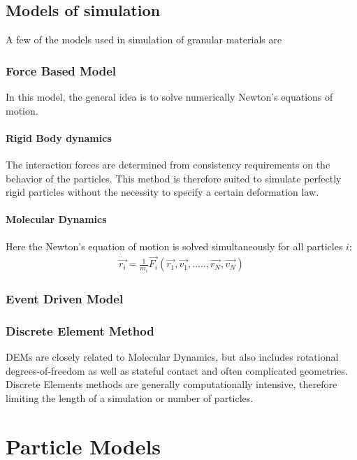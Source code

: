 \subsection{Models of simulation}

A few of the models used in simulation of granular materials are

\subsubsection{Force Based Model}

In this model, the general idea is to solve numerically Newton's equations of motion.

\paragraph{Rigid Body dynamics}
The interaction forces are determined from consistency requirements on the behavior of the particles. This method is therefore suited to simulate perfectly rigid particles without the necessity to specify a certain deformation law.

\paragraph{Molecular Dynamics}

Here the Newton's equation of motion is solved simultaneously for all particles $i$:
\begin{align*}
\ddot{\vec{r_{i}}} = \frac{1}{m_{i}} \vec{F_{i}}(\vec{r_{1}}, \vec{v_{1}},.....,\vec{r_{N}},\vec{v_{N}})
\end{align*}

\subsubsection{Event Driven Model}



\subsubsection{Discrete Element Method}

DEMs are closely related to Molecular Dynamics, but also includes rotational degrees-of-freedom as well as stateful contact and often complicated geometries. Discrete Elements methods are generally computationally intensive, therefore limiting the length of a simulation or number of particles.

\section{Particle Models}


